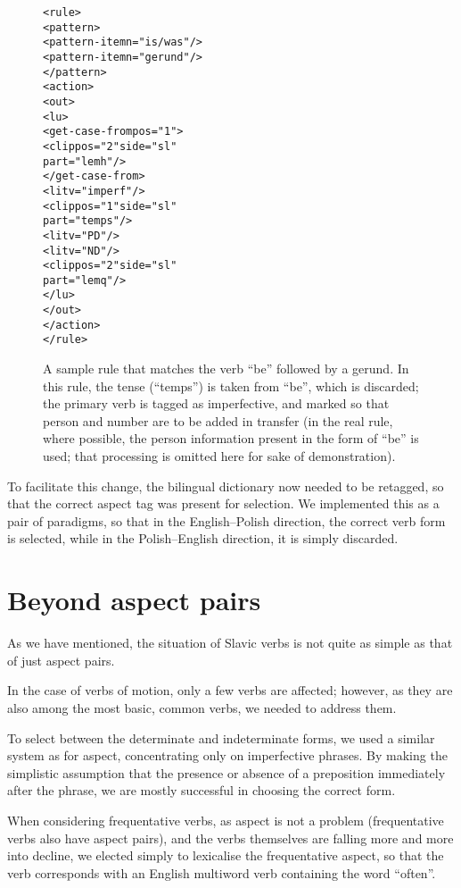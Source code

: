 \documentclass[11pt]{article}
\begin{document}
\begin{figure}[htbp]
\label{figure:rule}
\begin{small}
\begin{alltt}
<rule>
  <pattern>
    <pattern-item n="is/was"/>
    <pattern-item n="gerund"/>
  </pattern>
  <action>
    <out>
      <lu>
        <get-case-from pos="1">
          <clip pos="2" side="sl" 
           part="lemh"/>
        </get-case-from>
        <lit v="imperf"/>
        <clip pos="1" side="sl" 
         part="temps"/>
        <lit v="PD"/>
        <lit v="ND"/>
        <clip pos="2" side="sl" 
         part="lemq"/>
      </lu>  
    </out>
  </action>
</rule>
\end{alltt}
\end{small}
\caption{A sample rule that matches the verb ``be'' followed by a
gerund. In this rule, the tense (``temps'') is taken from ``be'', which
is discarded; the primary verb is tagged as imperfective, and marked so
that person and number are to be added in transfer (in the real rule, 
where possible, the person information present in the form of ``be'' is
used; that processing is omitted here for sake of demonstration).}
\end{figure}

To facilitate this change, the bilingual dictionary now needed to be
retagged, so that the correct aspect tag was present for selection. We
implemented this as a pair of paradigms, so that in the English--Polish
direction, the correct verb form is selected, while in the 
Polish--English direction, it is simply discarded.

\section{Beyond aspect pairs}

As we have mentioned, the situation of Slavic verbs is not quite as
simple as that of just aspect pairs.

In the case of verbs of motion, only a few verbs are affected; however,
as they are also among the most basic, common verbs, we needed to 
address them. 

To select between the determinate and indeterminate forms, we used a
similar system as for aspect, concentrating only on imperfective
phrases. By making the simplistic assumption that the presence or
absence of a preposition immediately after the phrase, we are mostly
successful in choosing the correct form.

When considering frequentative verbs, as aspect is not a problem
(frequentative verbs also have aspect pairs), and the verbs themselves
are falling more and more into decline, we elected simply to lexicalise
the frequentative aspect, so that the verb corresponds with an English
multiword verb containing the word ``often''.\\ 
\end{document}
